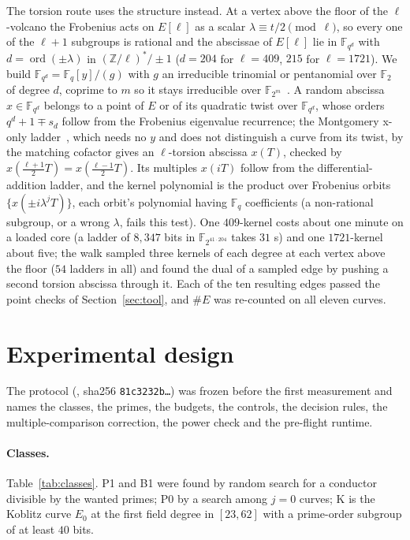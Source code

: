 \documentclass[10pt,a4paper]{article}
\theoremstyle{remark}
\newcommand{\FF}{\mathbb{F}}
\newcommand{\ZZ}{\mathbb{Z}}
\newcommand{\code}[1]{\texttt{#1}}
\DeclareRobustCommand{\art}[1]{\texttt{\detokenize{#1}}}
\begin{document}
The torsion route uses the structure instead. At a vertex above the floor of
the $\ell$-volcano the Frobenius acts on $E[\ell]$ as a scalar
$\lambda \equiv t/2 \pmod \ell$, so every one of the $\ell + 1$ subgroups is
rational and the abscissae of $E[\ell]$ lie in $\FF_{q^d}$ with
$d = \operatorname{ord}(\pm\lambda)$ in $(\ZZ/\ell)^*/\pm 1$ ($d = 204$ for
$\ell = 409$, $215$ for $\ell = 1721$). We build $\FF_{q^d} = \FF_q[y]/(g)$ with
$g$ an irreducible trinomial or pentanomial over $\FF_2$ of degree $d$,
coprime to $m$ so it stays irreducible over $\FF_{2^m}$~\cite{LidlNiederreiter1997}.
A random abscissa $x \in \FF_{q^d}$ belongs to a point of $E$ or of its
quadratic twist over $\FF_{q^d}$, whose orders $q^d + 1 \mp s_d$ follow from
the Frobenius eigenvalue recurrence; the Montgomery x-only
ladder~\cite{Montgomery1987,LopezDahab1999}, which needs no $y$ and does not
distinguish a curve from its twist, by the matching cofactor gives an
$\ell$-torsion abscissa $x(T)$, checked by
$x(\tfrac{\ell+1}{2}T) = x(\tfrac{\ell-1}{2}T)$. Its multiples $x(iT)$ follow
from the differential-addition ladder, and the kernel polynomial is the
product over Frobenius orbits $\{x(\pm i\lambda^j T)\}$, each orbit's
polynomial having $\FF_q$ coefficients (a non-rational subgroup, or a wrong
$\lambda$, fails this test). One $409$-kernel costs about one minute on a
loaded core (a ladder of $8{,}347$ bits in $\FF_{2^{41\cdot 204}}$ takes $31$ s)
and one $1721$-kernel about five; the walk sampled three kernels of each
degree at each vertex above the floor ($54$ ladders in all) and found the
dual of a sampled edge by pushing a second torsion abscissa through it. Each
of the ten resulting edges passed the point checks of
Section~\ref{sec:tool}, and $\#E$ was re-counted on all eleven curves.

\section{Experimental design}
\label{sec:design}

The protocol (\art{crypto:research/isogeny-class-rho/PROTOCOL.md}, sha256
\code{81c3232b\ldots}) was frozen before the first measurement and names the
classes, the primes, the budgets, the controls, the decision rules, the
multiple-comparison correction, the power check and the pre-flight runtime.

\paragraph{Classes.} Table~\ref{tab:classes}. P1 and B1 were found by random
search for a conductor divisible by the wanted primes; P0 by a search among
$j = 0$ curves; K is the Koblitz curve $E_0$ at the first field degree in
$[23, 62]$ with a prime-order subgroup of at least $40$ bits.
\end{document}
